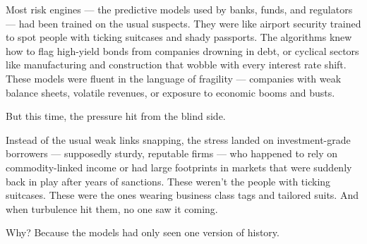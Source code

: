 \medskip

Most risk engines — the predictive models used by banks, funds, and regulators — had been trained on the usual suspects.
They were like airport security trained to spot people with ticking suitcases and shady passports. The algorithms knew how to 
flag high-yield bonds from companies drowning in debt, or cyclical sectors like manufacturing and construction that wobble 
with every interest rate shift. These models were fluent in the language of fragility — companies with weak balance sheets, 
volatile revenues, or exposure to economic booms and busts.

But this time, the pressure hit from the blind side.

Instead of the usual weak links snapping, the stress landed on investment-grade borrowers — supposedly sturdy, reputable firms 
— who happened to rely on commodity-linked income or had large footprints in markets that were suddenly back in play after 
years of sanctions. These weren’t the people with ticking suitcases. These were the ones wearing business class tags and 
tailored suits. And when turbulence hit them, no one saw it coming.

Why? Because the models had only seen one version of history.

\medskip

